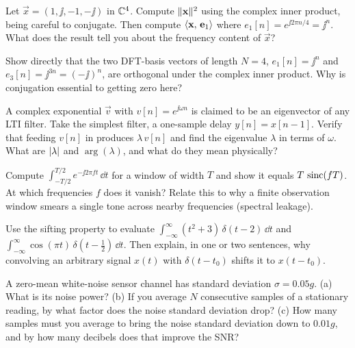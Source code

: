 \begin{exercise}
Let $\vec x = (1, \jj, -1, -\jj)$ in $\mathbb{C}^4$. Compute $\lVert\mathbf{x}\rVert^2$ using the complex inner
product, being careful to conjugate. Then compute $\langle \mathbf{x},\, \mathbf{e}_1 \rangle$ where $e_1[n] =
e^{\jj 2\pi n/4} = \jj^n$. What does the result tell you about the frequency content of $\vec x$?
\end{exercise}

\begin{exercise}
Show directly that the two DFT-basis vectors of length $N=4$, $e_1[n] = \jj^n$ and $e_3[n] =
\jj^{3n} = (-\jj)^n$, are orthogonal under the complex inner product. Why is conjugation
essential to getting zero here?
\end{exercise}

\begin{exercise}
A complex exponential $\vec v$ with $v[n] = e^{\jj\omega n}$ is claimed to be an eigenvector of
any LTI filter. Take the simplest filter, a one-sample delay $y[n] = x[n-1]$. Verify that feeding
$v[n]$ in produces $\lambda\,v[n]$ and find the eigenvalue $\lambda$ in terms of $\omega$. What
are $\lvert\lambda\rvert$ and $\arg(\lambda)$, and what do they mean physically?
\end{exercise}

\begin{exercise}
Compute $\int_{-T/2}^{T/2} e^{-\jj 2\pi f t}\,\dd t$ for a window of width $T$ and show it equals
$T\,\operatorname{sinc}(fT)$. At which frequencies $f$ does it vanish? Relate this to why a finite observation
window smears a single tone across nearby frequencies (spectral leakage).
\end{exercise}

\begin{exercise}
Use the sifting property to evaluate $\int_{-\infty}^{\infty}(t^2 + 3)\,\delta(t-2)\,\dd t$ and
$\int_{-\infty}^{\infty}\cos(\pi t)\,\delta(t - \tfrac12)\,\dd t$. Then explain, in one or two
sentences, why convolving an arbitrary signal $x(t)$ with $\delta(t - t_0)$ shifts it to
$x(t - t_0)$.
\end{exercise}

\begin{exercise}
A zero-mean white-noise sensor channel has standard deviation $\sigma = 0.05g$. (a) What is its
noise power? (b) If you average $N$ consecutive samples of a stationary reading, by what factor
does the noise standard deviation drop? (c) How many samples must you average to bring the noise
standard deviation down to $0.01g$, and by how many decibels does that improve the SNR?
\end{exercise}

